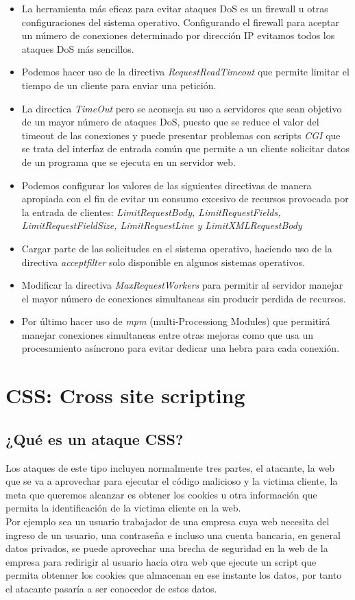 \documentclass[a4paper, 10pt]{article} %
\begin{document}
\begin{itemize}
\item La herramienta más eficaz para evitar ataques DoS es un firewall u otras configuraciones del sistema operativo. Configurando el firewall para aceptar un número de conexiones determinado por dirección IP evitamos todos los ataques DoS más sencillos.
\item Podemos hacer uso de la directiva \textit{RequestReadTimeout} que permite limitar el tiempo de un cliente para enviar una petición.
\item La directica \textit{TimeOut} pero se aconseja su uso a servidores que sean objetivo de un mayor número de ataques DoS, puesto que se reduce el valor del timeout de las conexiones y puede presentar problemas con scripts \textit{CGI} \cite{13} que se trata del interfaz de entrada común que permite a un cliente solicitar datos de un programa que se ejecuta en un servidor web.
\item Podemos configurar los valores de las siguientes directivas de manera apropiada con el fin de evitar un consumo excesivo de recursos provocada por la entrada de clientes: 
\textit{LimitRequestBody, LimitRequestFields, LimitRequestFieldSize, LimitRequestLine y LimitXMLRequestBody}
\item Cargar parte de las solicitudes en el sistema operativo, haciendo uso de la directiva \textit{acceptfilter} solo disponible en algunos sistemas operativos.
\item Modificar la directiva \textit{MaxRequestWorkers} para permitir al servidor manejar el mayor número de conexiones simultaneas sin producir perdida de recursos. 
\item Por último hacer uso de \textit{mpm} (multi-Processiong Modules) que permitirá manejar conexiones simultaneas entre otras mejoras como que usa un procesamiento asíncrono para evitar dedicar una hebra para cada conexión.
\end{itemize}
\section{CSS: Cross site scripting}
\subsection{¿Qué es un ataque CSS?}
Los ataques de este tipo incluyen normalmente tres partes, el atacante, la web que se va a aprovechar para ejecutar el código malicioso y la victima cliente, la meta que queremos alcanzar es obtener los cookies u otra información que permita la identificación de la victima cliente en la web.\\
Por ejemplo sea un usuario trabajador de una empresa cuya web necesita del ingreso de un usuario, una contraseña e incluso una cuenta bancaria, en general datos privados, se puede aprovechar una brecha de seguridad en la web de la empresa para redirigir al usuario hacia otra web que ejecute un script que permita obtenner los cookies que almacenan en ese instante los datos, por tanto el atacante pasaría a ser conocedor de estos datos.
\end{document}
